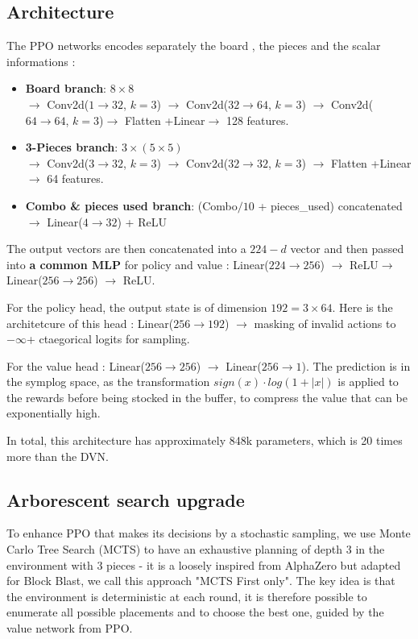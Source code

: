 \documentclass[10pt]{article}
\begin{document}
\subsection{Architecture}
The PPO networks encodes separately the board , the pieces and the scalar informations :
\begin{itemize}
    \item \textbf{Board branch}:  $8\times8$ \\ $\to$ Conv2d($1\to32$, $k=3$) $\to$ Conv2d($32\to64$, $k=3$) $\to$ Conv2d($64\to64$, $k=3$)$\to$ Flatten +Linear$\to$ 128 features.
    \item \textbf{3-Pieces branch}:  $3\times(5\times5)$ \\ $\to$ Conv2d($3\to32$, $k=3$) $\to$ Conv2d($32\to32$, $k=3$) $\to$ Flatten +Linear$\to$ 64 features.
    \item \textbf{Combo \& pieces used branch}:  (Combo$/10$ + pieces\_used) concatenated$\to$ Linear($4\to32$) + ReLU
\end{itemize}
The output vectors are then concatenated into a $224-d$ vector and then passed into \textbf{a common MLP} for policy and value : Linear($224\to256$) $\to$ ReLU$\to$Linear($256\to256$) $\to$ ReLU.

For the policy head, the output state is of dimension $192 = 3 \times 64$. Here is the architetcure of this head : Linear($256\to192$) $\to$ masking of invalid actions to $- \infty$+ ctaegorical logits for sampling.

For the value head :  Linear($256\to256$) $\to$ Linear($256\to1$). The prediction is in the symplog space, as the transformation $sign(x)\cdot log(1+|x|)$ is applied to the rewards before being stocked in the buffer, to compress the value that can be exponentially high.

In total, this architecture has approximately 848k parameters, which is 20 times more than the DVN.


\subsection{Arborescent search upgrade}
To enhance PPO that makes its decisions by a stochastic sampling, we use Monte Carlo Tree Search (MCTS) to have an exhaustive planning of depth 3 in the environment with 3 pieces - it is a loosely inspired from AlphaZero but adapted for Block Blast, we call this approach "MCTS First only". The key idea is that the environment is deterministic at each round, it is therefore possible to enumerate all possible placements and to choose the best one, guided by the value network from PPO.
\end{document}
